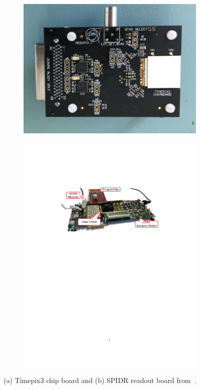 \begin{figure}[htbp] \centering
  \begin{subfigure}[b]{0.3\textwidth}
    \includegraphics[width=\textwidth]{./figures/Calibration/Timepix3board2.jpg}
    \caption{}\label{fig:Timepix3board_PCB}
  \end{subfigure}\hfill
  \begin{subfigure}[b]{0.65\textwidth}
    \includegraphics[width=\textwidth]{./figures/Calibration/SPIDRboard}
    \caption{}
  \end{subfigure}
  \caption{(a) Timepix3 chip board and (b) SPIDR readout board
    from~\cite{Timepix3Poikela}.}
  \label{fig:Timepix3board_SPIDR}
\end{figure}

